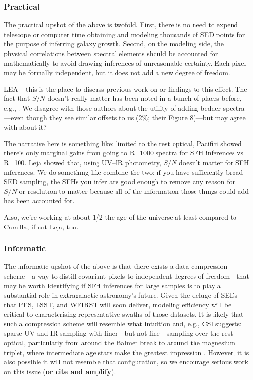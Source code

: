 \documentclass[a4paper,fleqn,usenatbib]{mnras}
\newcommand{\bfr}{\bf\color{red}}
\newcommand{\bfb}{\color{myblue}}
\begin{document}
\subsubsection{Practical}

The practical upshot of the above is twofold. First, there is no need to expend telescope
or computer time obtaining and modeling thousands of SED points for the purpose of inferring 
galaxy growth. Second, on the modeling side, the physical correlations between spectral
elements should be accounted for mathematically to avoid drawing inferences of unreasonable 
certainty. Each pixel may be formally independent, but it does not add a new degree of freedom.
{\bfb LEA -- this is the place to discuss previous work on or findings to this effect. The fact
that $S/N$ doesn't really matter has been noted in a bunch of places before, e.g., \citet{Leja19}.
We disagree with those authors about the utility of adding bedder spectra---even though they
see similar offsets to us (2\%; their Figure 8)---but may agree with \citet{Ocvirk06} about it?

The narrative here is something like: limited to the rest optical, Pacifici showed there's only
marginal gains from going to R=1000 spectra for SFH inferences vs R=100. Leja showed that, 
using UV--IR photometry, $S/N$ doesn't matter for SFH inferences. We do something like
combine the two: if you have sufficiently broad SED sampling, the SFHs you infer are good enough
to remove any reason for $S/N$ or resolution to matter because all of the information those
things could add has been accounted for.

Also, we're working at about 1/2 the age of the universe at least compared to Camilla, if not
Leja, too.}

\subsubsection{Informatic}

The informatic upshot of the above is that there exists a data compression scheme---a way to
distill covariant pixels to independent degrees of freedom---that may be
worth identifying if SFH inferences for large samples is to play a substantial role in extragalactic 
astronomy's future. Given the deluge of SEDs that PFS, LSST, and WFIRST will soon deliver, 
modeling efficiency will be critical to characterising representative swaths of those datasets. 
It is likely that such a compression scheme will resemble what intuition
and, e.g., CSI suggests: sparse UV and IR sampling with finer---but not fine---sampling over
the rest optical, particularly from around the Balmer break to around the magnesium triplet,
where intermediate age stars make the greatest impression \citep[e.g.,][]{Dressler16}. However,
it is also possible it will not resemble that configuration, so we encourage serious work on this 
issue ({\bfr or cite and amplify}).
\end{document}

